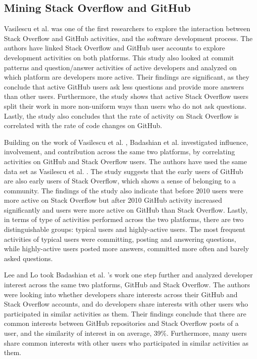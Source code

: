     \subsection{Mining Stack Overflow and GitHub}
        Vasilescu et al. \cite{vasilescu2013stackoverflow} was one of the first researchers to explore the interaction between Stack Overflow and GitHub activities, and the software development process. The authors have linked Stack Overflow and GitHub user accounts to explore development activities on both platforms. This study also looked at commit patterns and question/answer activities of active developers and analyzed on which platform are developers more active. Their findings are significant, as they conclude that active GitHub users ask less questions and provide more answers than other users. Furthermore, the study shows that active Stack Overflow users split their work in more non-uniform ways than users who do not ask questions. Lastly, the study also concludes that the rate of activity on Stack Overflow is correlated with the rate of code changes on GitHub.
        
        Building on the work of Vasilescu et al. \cite{vasilescu2013stackoverflow}, Badashian et al. \cite{badashian2014involvement} investigated influence, involvement, and contribution across the same two platforms, by correlating activities on GitHub and Stack Overflow users. The authors have used the same data set as Vasilescu et al. \cite{vasilescu2013stackoverflow}. The study suggests that the early users of GitHub are also early users of Stack Overflow, which shows a sense of belonging to a community. The findings of the study also indicate that before 2010 users were more active on Stack Overflow but after 2010 GitHub activity increased significantly and users were more active on GitHub than Stack Overflow. Lastly, in terms of type of activities performed across the two platforms, there are two distinguishable groups: typical users and highly-active users. The most frequent activities of typical users were committing, posting and answering questions, while highly-active users posted more answers, committed more often and barely asked questions. 
        
        Lee and Lo \cite{lee2017github} took Badashian et al. \cite{badashian2014involvement}'s work one step further and analyzed developer interest across the same two platforms, GitHub and Stack Overflow. The authors were looking into whether developers share interests across their GitHub and Stack Overflow accounts, and do developers share interests with other users who participated in similar activities as them. Their findings conclude that there are common interests between GitHub repositories and Stack Overflow posts of a user, and the similarity of interest in on average, 39\%. Furthermore, many users share common interests with other users who participated in similar activities as them.
        
